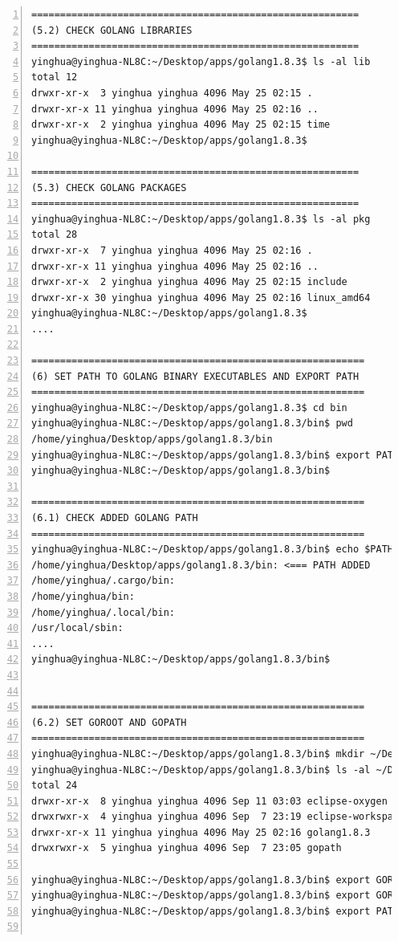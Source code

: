 \begin{lstlisting}[breaklines, frame=single, numbers=left, caption={Linux command for Golang compiler installation}, label=commandline-02]
=========================================================
(5.2) CHECK GOLANG LIBRARIES
=========================================================
yinghua@yinghua-NL8C:~/Desktop/apps/golang1.8.3$ ls -al lib
total 12
drwxr-xr-x  3 yinghua yinghua 4096 May 25 02:15 .
drwxr-xr-x 11 yinghua yinghua 4096 May 25 02:16 ..
drwxr-xr-x  2 yinghua yinghua 4096 May 25 02:15 time
yinghua@yinghua-NL8C:~/Desktop/apps/golang1.8.3$

=========================================================
(5.3) CHECK GOLANG PACKAGES
=========================================================
yinghua@yinghua-NL8C:~/Desktop/apps/golang1.8.3$ ls -al pkg
total 28
drwxr-xr-x  7 yinghua yinghua 4096 May 25 02:16 .
drwxr-xr-x 11 yinghua yinghua 4096 May 25 02:16 ..
drwxr-xr-x  2 yinghua yinghua 4096 May 25 02:15 include
drwxr-xr-x 30 yinghua yinghua 4096 May 25 02:16 linux_amd64
yinghua@yinghua-NL8C:~/Desktop/apps/golang1.8.3$
....

==========================================================
(6) SET PATH TO GOLANG BINARY EXECUTABLES AND EXPORT PATH
==========================================================
yinghua@yinghua-NL8C:~/Desktop/apps/golang1.8.3$ cd bin
yinghua@yinghua-NL8C:~/Desktop/apps/golang1.8.3/bin$ pwd
/home/yinghua/Desktop/apps/golang1.8.3/bin
yinghua@yinghua-NL8C:~/Desktop/apps/golang1.8.3/bin$ export PATH=/home/yinghua/Desktop/apps/golang1.8.3/bin:$PATH
yinghua@yinghua-NL8C:~/Desktop/apps/golang1.8.3/bin$

==========================================================
(6.1) CHECK ADDED GOLANG PATH
==========================================================
yinghua@yinghua-NL8C:~/Desktop/apps/golang1.8.3/bin$ echo $PATH
/home/yinghua/Desktop/apps/golang1.8.3/bin: <=== PATH ADDED
/home/yinghua/.cargo/bin:
/home/yinghua/bin:
/home/yinghua/.local/bin:
/usr/local/sbin:
....
yinghua@yinghua-NL8C:~/Desktop/apps/golang1.8.3/bin$


==========================================================
(6.2) SET GOROOT AND GOPATH
==========================================================
yinghua@yinghua-NL8C:~/Desktop/apps/golang1.8.3/bin$ mkdir ~/Desktop/apps/gopath
yinghua@yinghua-NL8C:~/Desktop/apps/golang1.8.3/bin$ ls -al ~/Desktop/apps
total 24
drwxr-xr-x  8 yinghua yinghua 4096 Sep 11 03:03 eclipse-oxygen
drwxrwxr-x  4 yinghua yinghua 4096 Sep  7 23:19 eclipse-workspace
drwxr-xr-x 11 yinghua yinghua 4096 May 25 02:16 golang1.8.3
drwxrwxr-x  5 yinghua yinghua 4096 Sep  7 23:05 gopath

yinghua@yinghua-NL8C:~/Desktop/apps/golang1.8.3/bin$ export GOROOT=/home/yinghua/Desktop/apps/golang1.8.3
yinghua@yinghua-NL8C:~/Desktop/apps/golang1.8.3/bin$ export GOROOT=/home/yinghua/Desktop/apps/gopath
yinghua@yinghua-NL8C:~/Desktop/apps/golang1.8.3/bin$ export PATH=$GOPATH/bin:$PATH


\end{lstlisting}
